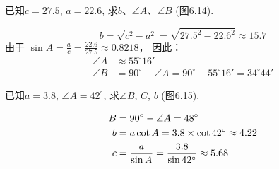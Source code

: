 \begin{example}
    已知$c=27.5$, $a=22.6$, 求$b$、$\angle A$、$\angle B$ (图6.14).
\end{example}

\begin{solution}
\[b=\sqrt{c^2-a^2}=\sqrt{27.5^2-22.6^2}\approx 15.7\]
由于
$\sin A=\frac{a}{c}=\frac{22.6}{27.5}\approx 0.8218$，
因此：
\[\begin{split}
    \angle A&\approx 55^{\circ}16'\\
\angle B&=90^{\circ}-\angle A=90^{\circ}-55^{\circ}16'=34^{\circ}44'
\end{split}\]
\end{solution}


\begin{example}
    已知$a=3.8$, $\angle A=42^{\circ}$, 求$\angle B$, $C$, $b$ (图6.15).
\end{example}

\begin{solution}
\[\begin{split}
    B&=90^{\circ} -\angle A=48^{\circ} \\
b&=a \cot A=3.8\times\cot 42^{\circ}\approx 4.22\\
c&=\dfrac{a}{\sin A}=\dfrac{3.8}{\sin 42^{\circ}}\approx 5.68 
\end{split}\]
    
\end{solution}

\begin{figure}[htp]\centering
    \begin{minipage}[t]{0.48\textwidth}
    \centering
{}
    \caption{}
    \end{minipage}
    \begin{minipage}[t]{0.48\textwidth}
    \centering
    \caption{}
    \end{minipage}
    \end{figure}


